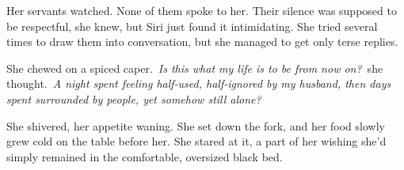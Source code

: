 Her servants watched. None of them spoke to her. Their silence was supposed to be respectful, she knew, but Siri just found it intimidating. She tried several times to draw them into conversation, but she managed to get only terse replies.

She chewed on a spiced caper.~\textit{Is this what my life is to be from now on?}~she thought.~\textit{A night spent feeling half-used, half-ignored by my husband, then days spent surrounded by people, yet somehow still alone?}

She shivered, her appetite waning. She set down the fork, and her food slowly grew cold on the table before her. She stared at it, a part of her wishing she’d simply remained in the comfortable, oversized black bed.

